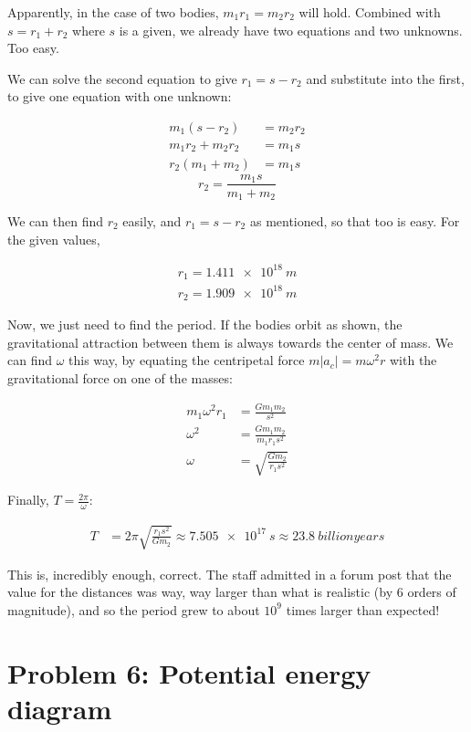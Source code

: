 \documentclass[12pt,a4paper]{report}
\begin{document}
Apparently, in the case of two bodies, $m_1 r_1 = m_2 r_2$ will hold. Combined with $s = r_1 + r_2$ where $s$ is a given, we already have two equations and two unknowns. Too easy.

We can solve the second equation to give $r_1 = s - r_2$ and substitute into the first, to give one equation with one unknown:

\begin{align}
m_1 (s - r_2) &= m_2 r_2\\
m_1 r_2 +m_2 r_2 &= m_1 s\\
r_2(m_1 + m_2) &= m_1 s
\end{align}
\begin{equation}
r_2 = \frac{m_1 s}{m_1 + m_2}
\end{equation}

We can then find $r_2$ easily, and $r_1 = s - r_2$ as mentioned, so that too is easy. For the given values,

\begin{align}
r_1 = \SI{1.411e18}{m}\\
r_2 = \SI{1.909e18}{m}
\end{align}

Now, we just need to find the period. If the bodies orbit as shown, the gravitational attraction between them is always towards the center of mass. We can find $\omega$ this way, by equating the centripetal force $m |a_c| = m \omega^2 r$ with the gravitational force on one of the masses:

\begin{align}
m_1 \omega^2 r_1 &= \frac{G m_1 m_2}{s^2}\\
\omega^2 &= \frac{G m_1 m_2}{m_1 r_1 s^2}\\
\omega &= \sqrt{\frac{G m_2}{r_1 s^2}}
\end{align}

Finally, $\displaystyle T = \frac{2 \pi}{\omega}$:

\begin{align}
T &= 2 \pi \sqrt{\frac{r_1 s^2}{G m_2}} \approx \SI{7.505e17}{s} \approx \SI{23.8}{billion years}
\end{align}

This is, incredibly enough, correct. The staff admitted in a forum post that the value for the distances was way, way larger than what is realistic (by 6 orders of magnitude), and so the period grew to about $10^9$ times larger than expected!

\section{Problem 6: Potential energy diagram}
\end{document}
